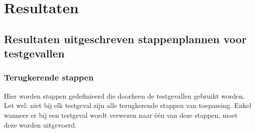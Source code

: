 
\chapter{Resultaten}
\label{ch:resultaten}

\section{Resultaten uitgeschreven stappenplannen voor testgevallen}

\subsection{Terugkerende stappen}
\label{recurringsteps}

Hier worden stappen gedefinieerd die doorheen de testgevallen gebruikt worden. Let wel: niet bij elk testgeval zijn alle terugkerende stappen van toepassing. Enkel wanneer er bij een testgeval wordt verwezen naar één van deze stappen, moet deze worden uitgevoerd.

